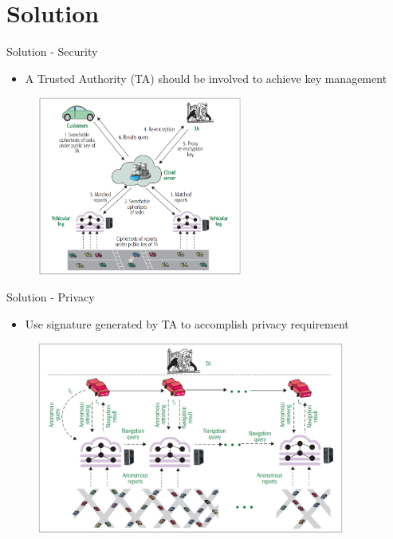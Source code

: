 \documentclass{beamer}
\begin{document}
\section{Solution}
\begin{frame}{Solution - Security}
    \begin{itemize}
        \item {A Trusted Authority (TA) should be involved to achieve key management}
    \end{itemize}
    \begin{figure}[t]
        \centering
        \includegraphics[width=0.6\textwidth]{figures/2.png}
    \end{figure}
\end{frame}
\begin{frame}{Solution - Privacy}
    \begin{itemize}
        \item {Use signature generated by TA to accomplish privacy requirement}
    \end{itemize}
    \begin{figure}[t]
        \centering
        \includegraphics[width=0.9\textwidth]{figures/3.png}
    \end{figure}
\end{frame}
\end{document}
